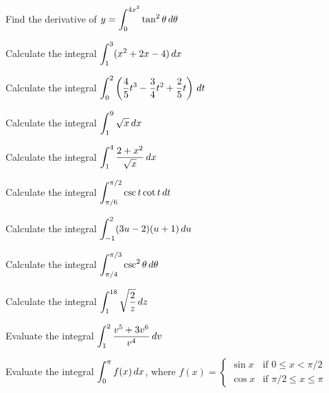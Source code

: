 \documentclass[notes]{subfiles}
\begin{document}
		\begin{ex}
			Find the derivative of $y = \displaystyle\int_0^{4x^3} \tan^2\theta\, d\theta$
		\end{ex}
			\newpage
			
		\begin{ex}
			Calculate the integral $\displaystyle \int_1^3 (x^2+2x-4)\, dx$
		\end{ex}
			
		\begin{ex}
			Calculate the integral $\displaystyle \int_0^2 \left( \dfrac{4}{5}t^3-\dfrac{3}{4}t^2+\dfrac{2}{5}t\right)\,dt$
		\end{ex}
			
		\begin{ex}
			Calculate the integral $\displaystyle \int_1^9 \sqrt{x}\,dx$
		\end{ex}
			\newpage
			
		\begin{ex}
			Calculate the integral $\displaystyle \int_1^4 \dfrac{2+x^2}{\sqrt{x}}\,dx$
		\end{ex}
			
		\begin{ex}
			Calculate the integral $\displaystyle \int_{\pi/6}^{\pi/2}\csc t\cot t\, dt$
		\end{ex}
			
		\begin{ex}
			Calculate the integral $\displaystyle \int_{-1}^2 (3u-2)(u+1)\, du$
		\end{ex}
			\newpage
			
		\begin{ex}
			Calculate the integral $\displaystyle \int_{\pi/4}^{\pi/3} \csc^2\theta\, d\theta$
		\end{ex}
			
		\begin{ex}
			Calculate the integral $\displaystyle \int_1^{18} \sqrt{\dfrac{2}{z}}\, dz$
		\end{ex}
			
		\begin{ex}	
			Evaluate the integral $\displaystyle \int_1^2 \dfrac{v^5+3v^6}{v^4}\, dv$
		\end{ex}
			\newpage
			
		\begin{ex}
			Evaluate the integral $\displaystyle\int_0^\pi f(x)\, dx$, where $f(x) = \begin{cases}\sin x & \text{if }0\leq x < \pi/2 \\ \cos x & \text{if }\pi/2\leq x\leq \pi \end{cases}$
		\end{ex}
			
\end{document}
